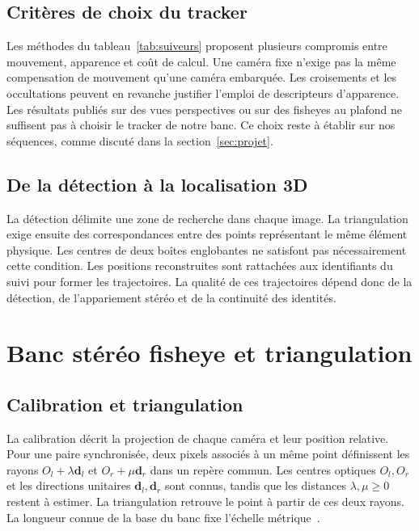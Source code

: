 \documentclass[11pt,a4paper]{article}
\begin{document}
\subsection{Critères de choix du tracker}
Les méthodes du tableau~\ref{tab:suiveurs} proposent plusieurs compromis entre mouvement, apparence et coût de calcul. Une caméra fixe n'exige pas la même compensation de mouvement qu'une caméra embarquée. Les croisements et les occultations peuvent en revanche justifier l'emploi de descripteurs d'apparence. Les résultats publiés sur des vues perspectives ou sur des fisheyes au plafond ne suffisent pas à choisir le tracker de notre banc. Ce choix reste à établir sur nos séquences, comme discuté dans la section~\ref{sec:projet}.









\subsection{De la détection à la localisation 3D}
La détection délimite une zone de recherche dans chaque image. La triangulation exige ensuite des correspondances entre des points représentant le même élément physique. Les centres de deux boîtes englobantes ne satisfont pas nécessairement cette condition. Les positions reconstruites sont rattachées aux identifiants du suivi pour former les trajectoires. La qualité de ces trajectoires dépend donc de la détection, de l'appariement stéréo et de la continuité des identités.



\section{Banc stéréo fisheye et triangulation}



\label{sec:stereo}
\label{sec:stereo-dense}
\subsection{Calibration et triangulation}
La calibration décrit la projection de chaque caméra et leur position relative. Pour une paire synchronisée, deux pixels associés à un même point définissent les rayons $O_l+\lambda\mathbf{d}_l$ et $O_r+\mu\mathbf{d}_r$ dans un repère commun. Les centres optiques $O_l,O_r$ et les directions unitaires $\mathbf{d}_l,\mathbf{d}_r$ sont connus, tandis que les distances $\lambda,\mu\geq0$ restent à estimer. La triangulation retrouve le point à partir de ces deux rayons. La longueur connue de la base du banc fixe l'échelle métrique~\cite{abraham2005}.
\end{document}
